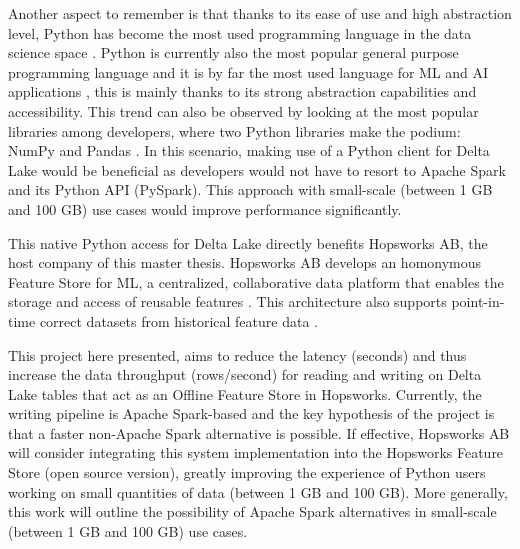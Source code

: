 Another aspect to remember is that thanks to its ease of use and high abstraction level, Python has become the most used programming language in the data science space \cite{nagpalPythonDataAnalytics2019}. Python is currently also the most popular general purpose programming language \cite{TIOBEIndex, StackOverflowDeveloper} and it is by far the most used language for \gls{ML} and \gls{AI} applications \cite{python-machine-learning}, this is mainly thanks to its strong abstraction capabilities and accessibility. This trend can also be observed by looking at the most popular libraries among developers, where two Python libraries make the podium: NumPy and Pandas \cite{StackOverflowDeveloper}.
In this scenario, making use of a Python client for Delta Lake would be beneficial as developers would not have to resort to Apache Spark and its Python \gls{API} (PySpark). This approach with small-scale (between 1 GB and 100 GB) use cases would improve performance significantly.

This native Python access for Delta Lake directly benefits Hopsworks \gls{AB}, the host company of this master thesis. Hopsworks \gls{AB} develops an homonymous Feature Store for \gls{ML}, a centralized, collaborative data platform that enables the storage and access of reusable features \cite{HopsworksBatchRealtime2024}. This architecture also supports point-in-time correct datasets from historical feature data \cite{Pettersson1695672}.

This project here presented, aims to reduce the latency (seconds) and thus increase the data throughput (rows/second) for reading and writing on Delta Lake tables that act as an Offline Feature Store in Hopsworks. Currently, the writing pipeline is Apache Spark-based and the key hypothesis of the project is that a faster non-Apache Spark alternative is possible. If effective, Hopsworks \gls{AB} will consider integrating this system implementation into the Hopsworks Feature Store (open source version), greatly improving the experience of Python users working on small quantities of data (between 1 GB and 100 GB). More generally, this work will outline the possibility of Apache Spark alternatives in small-scale (between 1 GB and 100 GB) use cases.